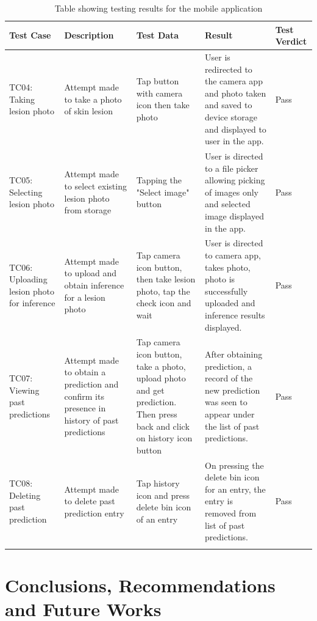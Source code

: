 \documentclass[12pt, a4paper]{article}
\begin{document}
\renewcommand{\arraystretch}{1.0}
\setlength{\tabcolsep}{6pt}
\begin{xltabular}{1\textwidth} { 
  | >{\raggedright\arraybackslash}X 
  | >{\raggedright\arraybackslash}X
  | >{\raggedright\arraybackslash}X
  | >{\raggedright\arraybackslash}X
  | >{\raggedright\arraybackslash}X
  |}
    \hline
    \textbf{Test Case} & \textbf{Description} & \textbf{Test Data} & \textbf{Result} & \textbf{Test Verdict}\\\hline
    TC04: Taking lesion photo & Attempt made to take a photo of skin lesion & Tap button with camera icon then take photo & User is redirected to the camera app and photo taken and saved to device storage and displayed to user in the app. & Pass\\\hline
    TC05: Selecting lesion photo & Attempt made to select existing lesion photo from storage & Tapping the "Select image" button & User is directed to a file picker allowing picking of images only and selected image displayed in the app. & Pass\\\hline
    TC06: Uploading lesion photo for inference & Attempt made to upload and obtain inference for a lesion photo & Tap camera icon button, then take lesion photo, tap the check icon and wait & User is directed to camera app, takes photo, photo is successfully uploaded and inference results displayed. & Pass\\\hline
    TC07: Viewing past predictions & Attempt made to obtain a prediction and confirm its presence in history of past predictions & Tap camera icon button, take a photo, upload photo and get prediction. Then press back and click on history icon button & After obtaining prediction, a record of the new prediction was seen to appear under the list of past predictions. & Pass\\\hline
    TC08: Deleting past prediction & Attempt made to delete past prediction entry & Tap history icon and press delete bin icon of an entry & On pressing the delete bin icon for an entry, the entry is removed from list of past predictions. & Pass\\\hline
    
    \caption{Table showing testing results for the mobile application}
    \label{tab:testing-results-app}
\end{xltabular}

\clearpage
\section{Conclusions, Recommendations and Future Works}
\end{document}
